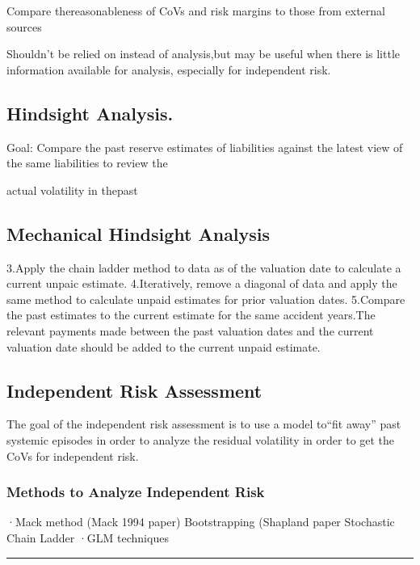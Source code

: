 \documentclass[
]{article}
\begin{document}
Compare thereasonableness of CoVs and risk margins to those from
external sources

Shouldn't be relied on instead of analysis,but may be useful when there
is little information available for analysis, especially for independent
risk.

\subsection{Hindsight Analysis.}\label{hindsight-analysis.}

Goal: Compare the past reserve estimates of liabilities against the
latest view of the same liabilities to review the

actual volatility in thepast

\subsection{Mechanical Hindsight
Analysis}\label{mechanical-hindsight-analysis}

3.Apply the chain ladder method to data as of the valuation date to
calculate a current unpaic estimate. 4.Iteratively, remove a diagonal of
data and apply the same method to calculate unpaid estimates for prior
valuation dates. 5.Compare the past estimates to the current estimate
for the same accident years.The relevant payments made between the past
valuation dates and the current valuation date should be added to the
current unpaid estimate.

\subsection{Independent Risk
Assessment}\label{independent-risk-assessment}

The goal of the independent risk assessment is to use a model to``fit
away'' past systemic episodes in order to analyze the residual
volatility in order to get the CoVs for independent risk.

\subsubsection{Methods to Analyze Independent
Risk}\label{methods-to-analyze-independent-risk}

·Mack method (Mack 1994 paper) Bootstrapping (Shapland paper Stochastic
Chain Ladder ·GLM techniques

\begin{center}\rule{0.5\linewidth}{0.5pt}\end{center}
\end{document}
